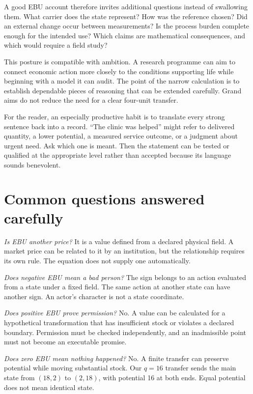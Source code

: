 A good EBU account therefore invites additional questions instead of swallowing them. What carrier does the state represent? How was the reference chosen? Did an external change occur between measurements? Is the process burden complete enough for the intended use? Which claims are mathematical consequences, and which would require a field study?

This posture is compatible with ambition. A research programme can aim to connect economic action more closely to the conditions supporting life while beginning with a model it can audit. The point of the narrow calculation is to establish dependable pieces of reasoning that can be extended carefully. Grand aims do not reduce the need for a clear four-unit transfer.

For the reader, an especially productive habit is to translate every strong sentence back into a record. ``The clinic was helped'' might refer to delivered quantity, a lower potential, a measured service outcome, or a judgment about urgent need. Ask which one is meant. Then the statement can be tested or qualified at the appropriate level rather than accepted because its language sounds benevolent.

\section{Common questions answered carefully}
\emph{Is EBU another price?} It is a value defined from a declared physical field. A market price can be related to it by an institution, but the relationship requires its own rule. The equation does not supply one automatically.

\emph{Does negative EBU mean a bad person?} The sign belongs to an action evaluated from a state under a fixed field. The same action at another state can have another sign. An actor's character is not a state coordinate.

\emph{Does positive EBU prove permission?} No. A value can be calculated for a hypothetical transformation that has insufficient stock or violates a declared boundary. Permission must be checked independently, and an inadmissible point must not become an executable promise.

\emph{Does zero EBU mean nothing happened?} No. A finite transfer can preserve potential while moving substantial stock. Our \(q=16\) transfer sends the main state from \((18,2)\) to \((2,18)\), with potential 16 at both ends. Equal potential does not mean identical state.

